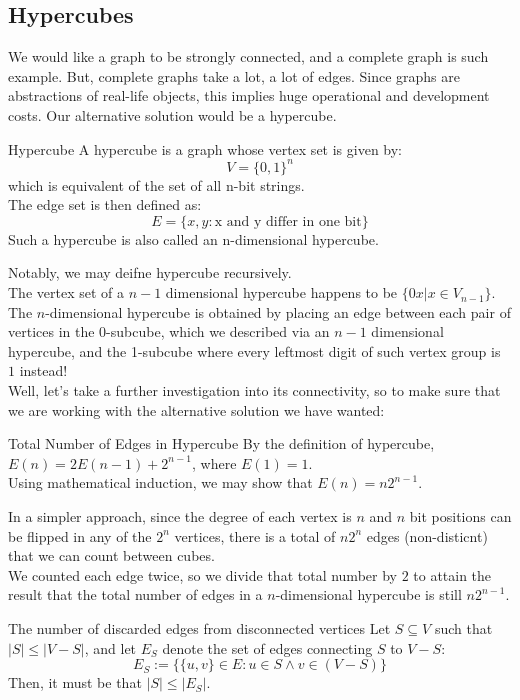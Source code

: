 \subsection{Hypercubes}
We would like a graph to be strongly connected, and a complete graph is such example. But, complete graphs take a lot, a lot of edges. Since graphs are abstractions of real-life objects, this implies huge operational and development costs. Our alternative solution would be a hypercube.
\begin{ln-define}{Hypercube}{}
    A hypercube is a graph whose vertex set is given by:
    \[V = {\{0, 1\}}^n\]
    which is equivalent of the set of all n-bit strings. \\
    The edge set is then defined as:
    \[E = \{{x, y}: \text{x and y differ in one bit}\}\]
    Such a hypercube is also called an n-dimensional hypercube.
\end{ln-define}
Notably, we may deifne hypercube recursively. \\
The vertex set of a $n - 1$ dimensional hypercube happens to be $\{0x | x \in V_{n - 1}\}$. The $n$-dimensional hypercube is obtained by placing an edge between each pair of vertices in the 0-subcube, which we described via an $n - 1$ dimensional hypercube, and the 1-subcube where every leftmost digit of such vertex group is $1$ instead! \\
Well, let's take a further investigation into its connectivity, so to make sure that we are working with the alternative solution we have wanted:
\begin{ln-lemma}{Total Number of Edges in Hypercube}{}
    By the definition of hypercube, $E(n)=2E(n-1)+2^{n-1}$, where $E(1)=1$. \\
    Using mathematical induction, we may show that $E(n) = n2^{n-1}$.

    In a simpler approach, since the degree of each vertex is $n$ and $n$ bit positions can be flipped in any of the $2^n$ vertices, there is a total of $n 2^n$ edges (non-disticnt) that we can count between cubes. \\
    We counted each edge twice, so we divide that total number by $2$ to attain the result that the total number of edges in a $n$-dimensional hypercube is still $n 2^{n-1}$.
\end{ln-lemma}
\begin{ln-theorem}{The number of discarded edges from disconnected vertices}{}
    Let $S \subseteq V$ such that $|S| \leq |V - S|$, and let $E_S$ denote the set of edges connecting $S$ to $V - S$:
    \[E_S := \{\{u, v\} \in E : u \in S \land v \in (V - S)\}\]
    Then, it must be that $|S| \leq |E_S|$.
\end{ln-theorem}
